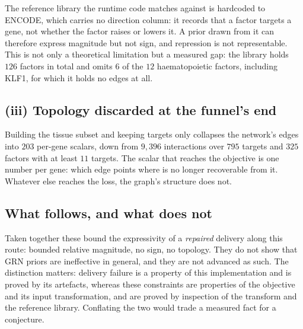 \documentclass[11 pt,a4 paper]{article}
\begin{document}
The reference library the runtime code matches against is hardcoded to ENCODE, which
carries no direction column: it records that a factor targets a gene, not whether the
factor raises or lowers it. A prior drawn from it can therefore express magnitude but not
sign, and repression is not representable. This is not only a theoretical limitation but a
measured gap: the library holds $126$ factors in total and omits $6$ of the $12$
haematopoietic factors, including KLF1, for which it holds no edges at all.

\subsection*{(iii) Topology discarded at the funnel's end}

Building the tissue subset and keeping targets only collapses the network's edges into
$203$ per-gene scalars, down from $9{,}396$ interactions over $795$ targets and $325$
factors with at least $11$ targets. The scalar that reaches the objective is one number per
gene: which edge points where is no longer recoverable from it. Whatever else reaches the
loss, the graph's structure does not.

\subsection*{What follows, and what does not}

Taken together these bound the expressivity of a \emph{repaired} delivery along this
route: bounded relative magnitude, no sign, no topology. They do not show that GRN priors
are ineffective in general, and they are not advanced as such. The distinction matters:
delivery failure is a property of this implementation and is proved by its artefacts,
whereas these constraints are properties of the objective and its input transformation, and
are proved by inspection of the transform and the reference library. Conflating the two
would trade a measured fact for a conjecture.
\end{document}
